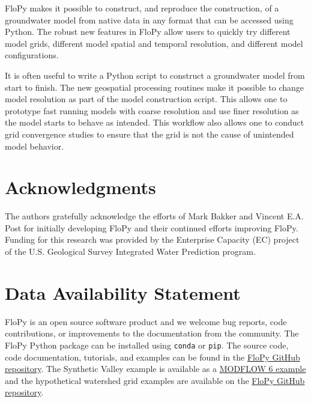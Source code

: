 \documentclass[11pt, oneside]{article}  	%
\begin{document}
FloPy makes it possible to construct, and reproduce the construction, of a groundwater model from native data in any format that can be accessed using Python. The robust new features in FloPy allow users to quickly try different model grids, different model spatial and temporal resolution, and different model configurations. 

It is often useful to write a Python script to construct a groundwater model from start to finish. The new geospatial processing routines make it possible to change model resolution as part of the model construction script. This allows one to prototype fast running models with coarse resolution and use finer resolution as the model starts to behave as intended. This workflow also allows one to conduct grid convergence studies to ensure that the grid is not the cause of unintended model behavior.

\section*{Acknowledgments}
The authors gratefully acknowledge the efforts of Mark Bakker and Vincent E.A. Post for initially developing FloPy and their continued efforts improving FloPy. Funding for this research was provided by the Enterprise Capacity (EC) project of the U.S. Geological Survey Integrated Water Prediction program.

\section*{Data Availability Statement}
FloPy is an open source software product and we welcome bug reports, code contributions, or improvements to the documentation from the community. The FloPy Python package can be installed using \texttt{conda} or \texttt{pip}. The source code, code documentation, tutorials, and examples can be found in the \href{https://github.com/modflowpy/flopy}{FloPy GitHub repository}. The Synthetic Valley example is available as a \href{https://modflow6-examples.readthedocs.io/en/master/examples.html}{MODFLOW 6 example} and the hypothetical watershed grid examples are available on the \href{https://github.com/modflowpy/flopy/tree/develop/examples/mf6_groundwater_paper}{FloPy GitHub repository}.




\end{document}
